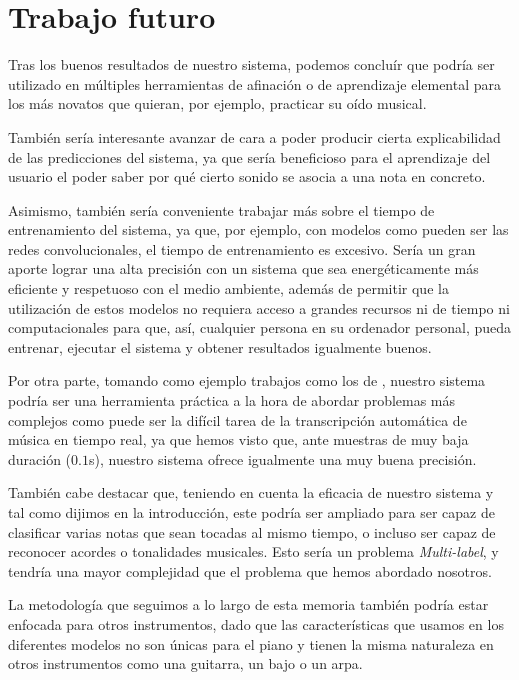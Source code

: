 \documentclass[12pt]{article}
\begin{document}
\section{Trabajo futuro}
\label{Trabajo futuro}

Tras los buenos resultados de nuestro sistema, podemos concluír que podría ser utilizado en múltiples herramientas de afinación o de aprendizaje elemental
para los más novatos que quieran, por ejemplo, practicar su oído musical.

\bigskip
También sería interesante avanzar de cara a poder producir cierta explicabilidad de las predicciones
del sistema, ya que sería beneficioso para el aprendizaje del usuario el poder saber por qué cierto
sonido se asocia a una nota en concreto.

\bigskip
Asimismo, también sería conveniente trabajar más sobre el tiempo de entrenamiento del sistema, ya que, por ejemplo,
con modelos como pueden ser las redes convolucionales, el tiempo de entrenamiento es excesivo. Sería un gran aporte
lograr una alta precisión con un sistema que sea energéticamente más eficiente y respetuoso con el medio ambiente, además de
permitir que la utilización de estos modelos no requiera acceso a grandes recursos ni de tiempo ni computacionales
para que, así, cualquier persona en su ordenador personal, pueda entrenar, ejecutar el sistema y obtener resultados igualmente buenos.

\bigskip
Por otra parte, tomando como ejemplo trabajos como los de \cite{klapuri2004signal}, nuestro sistema podría ser una herramienta práctica a la hora de abordar problemas
más complejos como puede ser la difícil tarea de la transcripción automática de música en tiempo real,
ya que hemos visto que, ante muestras de muy baja duración ($0.1$s), nuestro sistema ofrece igualmente una muy buena precisión.

\bigskip
También cabe destacar que, teniendo en cuenta la eficacia de nuestro sistema y tal como dijimos en la introducción, este podría ser ampliado para ser capaz de
clasificar varias notas que sean tocadas al mismo tiempo, o incluso ser capaz de reconocer acordes o tonalidades musicales. Esto sería un problema
\textit{Multi-label}, y tendría una mayor complejidad que el problema que hemos abordado nosotros.

\bigskip
La metodología que seguimos a lo largo de esta memoria también podría estar enfocada para otros instrumentos, dado que las características que usamos en
los diferentes modelos no son únicas para el piano y tienen la misma naturaleza en otros instrumentos como una guitarra, un bajo o un arpa.
\end{document}
